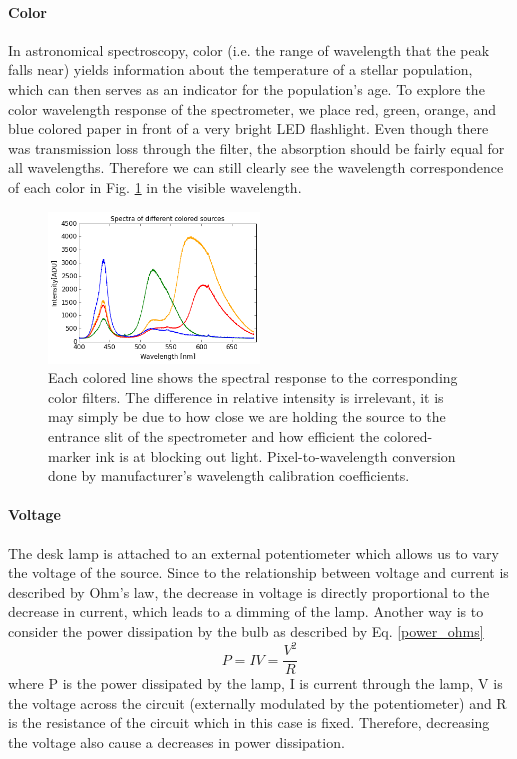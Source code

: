 \documentclass[authoryear, 12pt,5p, times]{elsarticle}
\begin{document}
	\paragraph*{\textbf{Color}} In astronomical spectroscopy, color (i.e. the range of wavelength that the peak falls near) yields information about the temperature of a stellar population, which can then serves as an indicator for the population's age. To explore the color wavelength response of the spectrometer, we place red, green, orange, and blue colored paper in front of a very bright LED flashlight. Even though there was transmission loss through the filter, the absorption should be fairly equal for all wavelengths. Therefore we can still clearly see the wavelength correspondence of each color in Fig. \ref{color}  in the visible wavelength. 
	\begin{figure}[h!]
\includegraphics[width=0.5\textwidth]{figures/color}
\caption{ Each colored line shows the spectral response to the corresponding color filters. The difference in relative intensity is irrelevant, it is may simply be due to how close we are holding the source to the entrance slit of the spectrometer and how efficient the colored-marker ink is at blocking out light. Pixel-to-wavelength conversion done by manufacturer's wavelength calibration coefficients.}
\label{color}
\end{figure}
	\paragraph*{\textbf{Voltage}} The desk lamp is attached to an external potentiometer which allows us to vary the voltage of the source. Since to the relationship between voltage and current is described by Ohm's law, the decrease in voltage is directly proportional to the decrease in current, which  leads to a dimming of the lamp. Another way is to consider the power dissipation by the bulb as described by Eq. \ref{power_ohms}
	\begin{equation}
	P=IV=\frac{V^2}{R}
	\label{power_ohms}
	\end{equation}
		where P is the power dissipated by the lamp, I is current through the lamp, V is the voltage across the circuit (externally modulated by the potentiometer) and R is the resistance of the circuit which in this case is fixed. Therefore, decreasing the voltage also cause a decreases in power dissipation.
		
\end{document}
